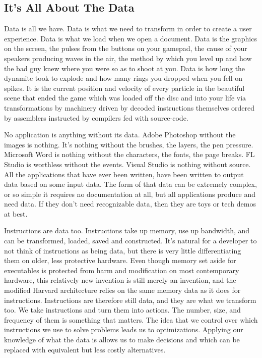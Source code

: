 \documentclass[a4paper,12pt]{article}
\begin{document}
\subsection{It's All About The Data}

Data is all we have.
Data is what we need to transform in order to create a user experience.
Data is what we load when we open a document.
Data is the graphics on the screen, the pulses from the buttons on your gamepad, the cause of your speakers producing waves in the air, the method by which you level up and how the bad guy knew where you were so as to shoot at you.
Data is how long the dynamite took to explode and how many rings you dropped when you fell on spikes.
It is the current position and velocity of every particle in the beautiful scene that ended the game which was loaded off the disc and into your life via transformations by machinery driven by decoded instructions themselves ordered by assemblers instructed by compilers fed with source-code.

No application is anything without its data.
Adobe Photoshop without the images is nothing.
It's nothing without the brushes, the layers, the pen pressure.
Microsoft Word is nothing without the characters, the fonts, the page breaks.
FL Studio is worthless without the events.
Visual Studio is nothing without source.
All the applications that have ever been written, have been written to output data based on some input data.
The form of that data can be extremely complex, or so simple it requires no documentation at all, but all applications produce and need data.
If they don't need recognizable data, then they are toys or tech demos at best.

Instructions are data too.
Instructions take up memory, use up bandwidth, and can be transformed, loaded, saved and constructed.
It's natural for a developer to not think of instructions as being data, but there is very little differentiating them on older, less protective hardware.
Even though memory set aside for executables is protected from harm and modification on most contemporary hardware, this relatively new invention is still merely an invention, and the modified Harvard architecture relies on the same memory data as it does for instructions.
Instructions are therefore still data, and they are what we transform too.
We take instructions and turn them into actions.
The number, size, and frequency of them is something that matters.
The idea that we control over which instructions we use to solve problems leads us to optimizations.
Applying our knowledge of what the data is allows us to make decisions and which can be replaced with equivalent but less costly alternatives.
\end{document}
